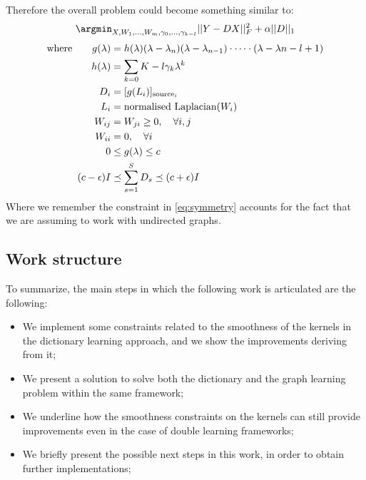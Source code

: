 Therefore the overall problem could become something similar to:
\begin{equation}
\argmin_{X,W_1,\dots,W_m,\gamma_0,\dots,\gamma_{k-l}} ||Y - DX||^2_F + \alpha||D||_1
\label{eq:overallProblem}
\end{equation}
\begin{align}
\text{where} \qquad g(\lambda) &= h(\lambda)(\lambda - \lambda_n)(\lambda - \lambda_{n-1})\cdot \dots \cdot (\lambda - \lambda{n-l+1}) \notag\\
h(\lambda) &= \sum_{k=0}{K-l}\gamma_k\lambda^{k} \notag\\
D_i &= [g(L_i)]_{\text{source}_i} \notag\\
L_i &= \text{normalised Laplacian}(W_i) \notag\\
W_{ij} &= W_{ji} \geq 0, \quad \forall i,j \label{eq:symmetry}\\
W_{ii} &= 0, \quad \forall i \notag\\
0 &\leq g(\lambda) \leq c \\
(c-\epsilon)I &\preceq \sum_{s=1}^{S}D_s \preceq (c+\epsilon)I
\end{align}
Where we remember the constraint in \ref{eq:symmetry} accounts for the fact that we are assuming to work with undirected graphs.\\

\subsection{Work structure}
To summarize, the main steps in which the following work is articulated are the following:
\begin{itemize}
\item We implement some constraints related to the smoothness of the kernels in the dictionary learning approach, and we show the improvements deriving from it;
\item We present a solution to solve both the dictionary and the graph learning problem within the same framework;
\item We underline how the smoothness constraints on the kernels can still provide improvements even in the case of double learning frameworks;
\item We briefly present the possible next steps in this work, in order to obtain further implementations;
\end{itemize}
